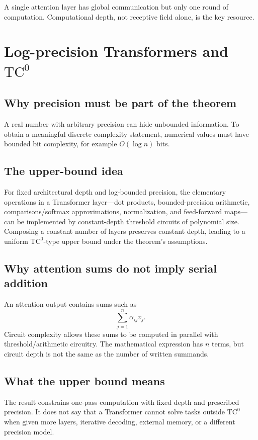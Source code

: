 \documentclass[11pt,a4paper,oneside,openany]{memoir}
\theoremstyle{definition}
\begin{document}
\begin{presentbox}
A single attention layer has global communication but only one round of computation.  Computational depth, not receptive field alone, is the key resource.
\end{presentbox}

\chapter{Log-precision Transformers and $\mathrm{TC}^0$}
\section{Why precision must be part of the theorem}
A real number with arbitrary precision can hide unbounded information.  To obtain a meaningful discrete complexity statement, numerical values must have bounded bit complexity, for example $O(\!\log n)$ bits.

\section{The upper-bound idea}
For fixed architectural depth and log-bounded precision, the elementary operations in a Transformer layer---dot products, bounded-precision arithmetic, comparisons/softmax approximations, normalization, and feed-forward maps---can be implemented by constant-depth threshold circuits of polynomial size.  Composing a constant number of layers preserves constant depth, leading to a uniform $\mathrm{TC}^0$-type upper bound under the theorem's assumptions.

\section{Why attention sums do not imply serial addition}
An attention output contains sums such as
\[
\sum_{j=1}^n \alpha_{ij}v_j.
\]
Circuit complexity allows these sums to be computed in parallel with threshold/arithmetic circuitry.  The mathematical expression has $n$ terms, but circuit depth is not the same as the number of written summands.

\section{What the upper bound means}
The result constrains one-pass computation with fixed depth and prescribed precision.  It does not say that a Transformer cannot solve tasks outside $\mathrm{TC}^0$ when given more layers, iterative decoding, external memory, or a different precision model.
\end{document}
